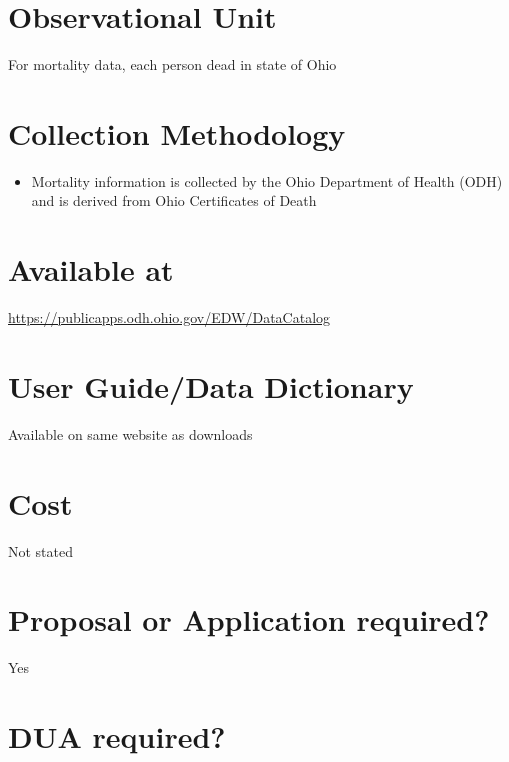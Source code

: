 \documentclass[
]{book}
\providecommand{\tightlist}{%
  \setlength{\itemsep}{0pt}\setlength{\parskip}{0pt}}
\begin{document}
\hypertarget{observational-unit-86}{%
\section{Observational Unit}\label{observational-unit-86}}

For mortality data, each person dead in state of Ohio

\hypertarget{collection-methodology-86}{%
\section{Collection Methodology}\label{collection-methodology-86}}

\begin{itemize}
\tightlist
\item
  Mortality information is collected by the Ohio Department of Health (ODH) and is derived from Ohio Certificates of Death
\end{itemize}

\hypertarget{available-at-86}{%
\section{Available at}\label{available-at-86}}

\url{https://publicapps.odh.ohio.gov/EDW/DataCatalog}

\hypertarget{user-guidedata-dictionary-86}{%
\section{User Guide/Data Dictionary}\label{user-guidedata-dictionary-86}}

Available on same website as downloads

\hypertarget{cost-86}{%
\section{Cost}\label{cost-86}}

Not stated

\hypertarget{proposal-or-application-required-86}{%
\section{Proposal or Application required?}\label{proposal-or-application-required-86}}

Yes

\hypertarget{dua-required-86}{%
\section{DUA required?}\label{dua-required-86}}
\end{document}
